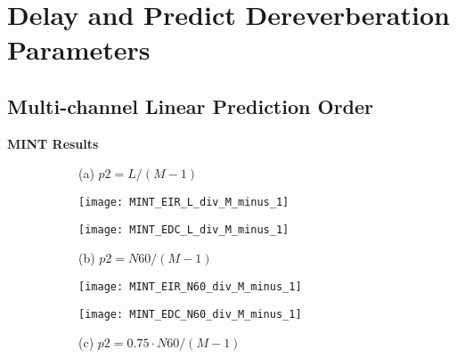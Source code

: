 \chapter{Delay and Predict Dereverberation Parameters}

\section{Multi-channel Linear Prediction Order}

\textbf{MINT Results}

\begin{figure}[H]
	\centering
	\begin{subfigure}[c]{0.2\textwidth}
		\centering
		\begin{minipage}[c][0.3\textwidth][c]{\linewidth} %
			\centering
			(a) \newline $p2 = L / (M-1)$
		\end{minipage}
	\end{subfigure}
	\begin{subfigure}[b]{0.3\textwidth}
		\centering
		\texttt{[image: MINT\_EIR\_L\_div\_M\_minus\_1]}
	\end{subfigure}
	\begin{subfigure}[b]{0.3\textwidth}
		\centering
		\texttt{[image: MINT\_EDC\_L\_div\_M\_minus\_1]}
	\end{subfigure}
	\begin{subfigure}[c]{0.2\textwidth}
		\centering
		\begin{minipage}[c][0.3\textwidth][c]{\linewidth} %
			\centering
			(b) \newline $p2 = N60 / (M-1)$
		\end{minipage}
	\end{subfigure}
	\begin{subfigure}[b]{0.3\textwidth}
		\centering
		\texttt{[image: MINT\_EIR\_N60\_div\_M\_minus\_1]}
	\end{subfigure}
	\begin{subfigure}[b]{0.3\textwidth}
		\centering
		\texttt{[image: MINT\_EDC\_N60\_div\_M\_minus\_1]}
	\end{subfigure}
	\begin{subfigure}[c]{0.2\textwidth}
		\centering
		\begin{minipage}[c][0.3\textwidth][c]{\linewidth} %
			\centering
			(c) \newline $p2 = 0.75 \cdot N60 / (M-1)$

\end{minipage}
\end{subfigure}
\end{figure}
